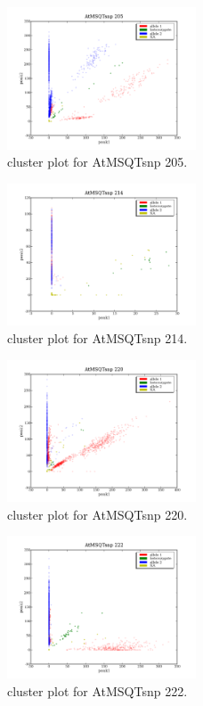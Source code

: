 \begin{figure}[H]
\includegraphics[width=0.5\textwidth]{figures/cluster_plot_AtMSQTsnp_205.png}
\caption{cluster plot for AtMSQTsnp 205.} \label{flAtMSQTsnp205}
\end{figure}

\begin{figure}[H]
\includegraphics[width=0.5\textwidth]{figures/cluster_plot_AtMSQTsnp_214.png}
\caption{cluster plot for AtMSQTsnp 214.} \label{flAtMSQTsnp214}
\end{figure}

\begin{figure}[H]
\includegraphics[width=0.5\textwidth]{figures/cluster_plot_AtMSQTsnp_220.png}
\caption{cluster plot for AtMSQTsnp 220.} \label{flAtMSQTsnp220}
\end{figure}

\begin{figure}[H]
\includegraphics[width=0.5\textwidth]{figures/cluster_plot_AtMSQTsnp_222.png}
\caption{cluster plot for AtMSQTsnp 222.} \label{flAtMSQTsnp222}
\end{figure}

